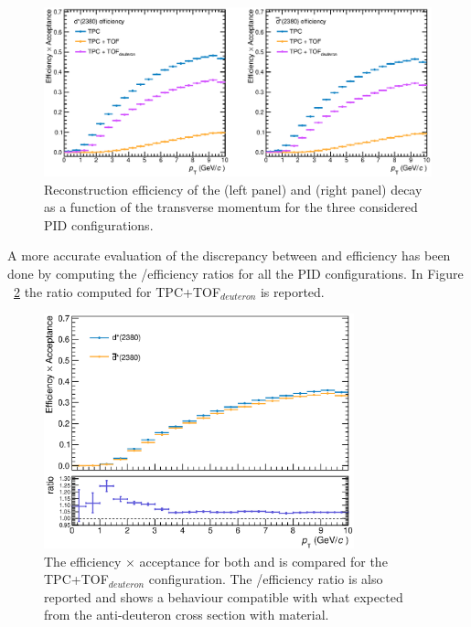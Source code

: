 \begin{figure}
    \centering
    \includegraphics[width=\textwidth]{gfx/eff3globalSLIM}
	\caption{Reconstruction efficiency of the \ds (left panel) and \dsbar (right panel) decay as a function of the transverse momentum for the three considered PID configurations.}
	\label{fig:effAM}
\end{figure}

A more accurate evaluation of the discrepancy between \ds and \dsbar efficiency has been done
by computing the \ds/\dsbar efficiency ratios for all the PID configurations.
In Figure ~\ref{fig:eff_ratioAM} the ratio computed for TPC+TOF$_{deuteron}$ is reported.

\begin{figure} [!h]
    \centering
    \includegraphics[width=0.8\textwidth]{gfx/eff_ratioAM1SLIM}
	\caption{The efficiency $\times$ acceptance for both \ds and \dsbar is compared for the TPC+TOF$_{deuteron}$ configuration. The \ds/\dsbar efficiency ratio is also reported and shows a behaviour compatible with what expected from the anti-deuteron cross section with material.}
	\label{fig:eff_ratioAM}
\end{figure}

